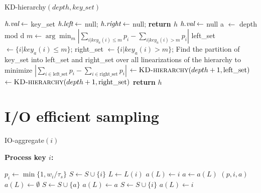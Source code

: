 \documentclass[11pt]{article}
\begin{document}
\begin{algorithm}[t]
\caption{{\sc KD-hierarchy}$(depth,key\_set)$}\label{kdhierarchy:alg}
\begin{algorithmic}[1]
\State  $\mbox{\em h.val} \leftarrow$ key\_set
\State  $\mbox{\em h.left} \leftarrow$ null; $\mbox{\em h.right} \leftarrow$ null; 
\State  \textbf{return $h$} 
\Else
\State $\mbox{\em h.val} \leftarrow$ null
\State a $\leftarrow$ depth mod d  
\State $m \leftarrow \arg\min_m \left\vert \sum_{i | key_a(i)\leq
  m}p_i-\sum_{i | key_a(i)> m}p_i\right\vert$ 
\Statex {}
\State left\_set $\leftarrow \{i | key_a(i)\leq m\}$;
\State right\_set $\leftarrow \{i | key_a(i)> m\}$;
\Else {}
\State Find the partition of key\_set into left\_set and right\_set
over all linearizations of the hierarchy to minimize
$\left\vert \sum_{i\in \mbox{left\_set}}p_i-\sum_{i\in \mbox{right\_set}} p_i\right\vert$
\EndIf
{}$\leftarrow \mbox{{\sc KD-hierarchy}}(depth+1,\mbox{left\_set})$
$\leftarrow  \mbox{{\sc KD-hierarchy}}(depth+1,\mbox{right\_set})$
\State \textbf{return} $h$ 
\EndIf
\end{algorithmic}
\end{algorithm}


\section{I/O efficient sampling}
\label{IO:sec}

\begin{algorithm}[t]
\caption{{\sc IO-aggregate}$(i)$}\label{io:alg}
{\bf Process key $i$:}
\begin{algorithmic}[1]
\State 
$p_i \leftarrow \min\{1, w_i/\tau_s\}$ 
 \State $S\leftarrow S\cup \{i\}$ 
\Else {}
 \State $L\leftarrow L(i)$ 
  
 \State $a(L) \leftarrow i$ 
 \Else {}
\State  $a \leftarrow a(L)$ 
$(p,i,a)$
  \State $a(L)\leftarrow \emptyset$
  \State $S\leftarrow S\cup\{a\}$
 \EndIf
  \State $a(L) \leftarrow a$
 \EndIf
  \State $S\leftarrow S\cup\{i\}$
 \EndIf
  \State $a(L) \leftarrow i$
 \EndIf
 \EndIf
 \EndIf
\end{algorithmic}
\end{algorithm}
\end{document}

